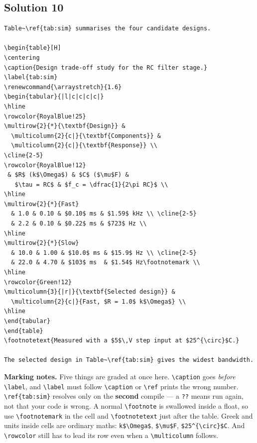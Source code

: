\documentclass[11pt]{article}
\begin{document}
\subsection*{Solution 10}
\begin{lstlisting}[style=tex]
Table~\ref{tab:sim} summarises the four candidate designs.

\begin{table}[H]
\centering
\caption{Design trade-off study for the RC filter stage.}
\label{tab:sim}
\renewcommand{\arraystretch}{1.6}
\begin{tabular}{|l|c|c|c|c|}
\hline
\rowcolor{RoyalBlue!25}
\multirow{2}{*}{\textbf{Design}} &
  \multicolumn{2}{c|}{\textbf{Components}} &
  \multicolumn{2}{c|}{\textbf{Response}} \\
\cline{2-5}
\rowcolor{RoyalBlue!12}
 & $R$ (k$\Omega$) & $C$ ($\mu$F) &
   $\tau = RC$ & $f_c = \dfrac{1}{2\pi RC}$ \\
\hline
\multirow{2}{*}{Fast}
  & 1.0 & 0.10 & $0.10$ ms & $1.59$ kHz \\ \cline{2-5}
  & 2.2 & 0.10 & $0.22$ ms & $723$ Hz \\
\hline
\multirow{2}{*}{Slow}
  & 10.0 & 1.00 & $10.0$ ms & $15.9$ Hz \\ \cline{2-5}
  & 22.0 & 4.70 & $103$ ms  & $1.54$ Hz\footnotemark \\
\hline
\rowcolor{Green!12}
\multicolumn{3}{|r|}{\textbf{Selected design}} &
  \multicolumn{2}{c|}{Fast, $R = 1.0$ k$\Omega$} \\
\hline
\end{tabular}
\end{table}
\footnotetext{Measured with a $5$\,V step input at $25^{\circ}$C.}

The selected design in Table~\ref{tab:sim} gives the widest bandwidth.
\end{lstlisting}
\textbf{Marking notes.} Five things are graded at once here.
\verb|\caption| goes \emph{before} \verb|\label|, and \verb|\label| must follow
\verb|\caption| or \verb|\ref| prints the wrong number. \verb|\ref{tab:sim}|
resolves only on the \textbf{second} compile --- a \texttt{??} means run again,
not that your code is wrong. A normal \verb|\footnote| is swallowed inside a
float, so use \verb|\footnotemark| in the cell and \verb|\footnotetext| just
after the table. Greek and units inside cells are ordinary maths:
\verb|k$\Omega$|, \verb|$\mu$F|, \verb|$25^{\circ}$C|. And \verb|\rowcolor|
still has to lead its row even when a \verb|\multicolumn| follows.

\clearpage
\end{document}
